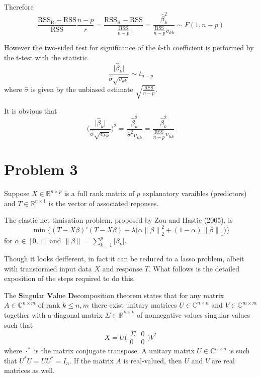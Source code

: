 \documentclass[a4paper]{article}
\newcommand{\nrm}[1]{{\left\| #1 \right \|}}
\newcommand{\R}{\text{R}}
\newcommand{\Real}{\mathbb{R}}
\newcommand{\Cplx}{\mathbb{C}}
\newcommand{\RSS}{\text{RSS}}
\begin{document}
Therefore 
\[ \frac{\RSS_\R - \RSS}{\RSS}\frac{n-p}{r} = \frac{\RSS_\R - \RSS}{\frac{\RSS}{n-p}} = \frac{\hat{\beta}_k^2}{\frac{\RSS}{n-p}v_{kk}} \sim F(1,n-p)\]

However the two-sided test for significance of the $k$-th coefficient is performed by the t-test with the statistic
\[\frac{\lvert \hat{\beta}_k \rvert}{\hat{\sigma}\sqrt{v_{kk}}}\sim t_{n-p}\] where $\hat{\sigma}$ is given by the unbiased estimate $\sqrt{\frac{\RSS}{n-p}}$.

It is obvious that 
\[\bigg(\frac{\lvert \hat{\beta}_k \rvert}{\hat{\sigma}\sqrt{v_{kk}}}\bigg)^2 = \frac{\hat{\beta}_k^2}{\hat{\sigma}^2 v_{kk}} = \frac{\hat{\beta}_k^2}{\frac{\RSS}{n-p} v_{kk}} \]


\section{Problem 3} %
\label{sec:problem_3}

Suppose $X\in \Real^{n\times p}$ is a full rank matrix of $p$ explanatory
varaibles (predictors) and $T\in \Real^{n\times 1}$ is the vector of
associated reponses.

The elastic net timisation problem, proposed by Zou and Hastie (2005), is
\[\min \Big\{ (T-X\beta)'(T-X\beta) + \lambda\big( \alpha \nrm{\beta}_2^2 + (1-\alpha) \nrm{\beta}_1 \big) \Big\}\]
for $\alpha\in [0,1]$ and $\nrm{\beta} = \sum_{k=1}^p \lvert \beta_k\rvert$.

Though it looks deifferent, in fact it can be reduced to a lasso problem, albeit with transformed input data $X$ and response $T$. What follows is the detailed exposition of the steps required to do this.

The \textbf{S}ingular \textbf{V}alue \textbf{D}ecomposition theorem states
that for any matrix $A\in \Cplx^{n\times m}$ of rank $k\leq n,m$ there exist
unitary matrices $U\in \Cplx^{n\times n}$ and $V\in\Cplx^{m\times m}$
together with a diagonal matrix $\Sigma\in \Real^{k\times k}$ of nonnegative
values singular values such that
\[X = U \Big(\begin{smallmatrix}\Sigma & 0 \\ 0 & 0\end{smallmatrix}\Big)V^*\]
where $\cdot^*$ is the matrix conjugate transpose. A unitary matrix
$U\in \Cplx^{n\times n}$ is such that $U^*U = UU^* = I_n$. If the matrix $A$ is real-valued, then $U$ and $V$ are real matrices as well.
\end{document}
